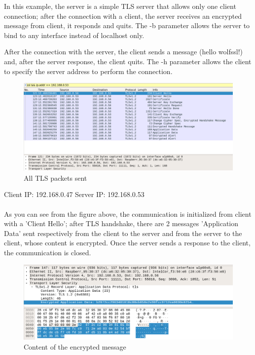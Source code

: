 \documentclass[a4paper,12pt]{article}
\begin{document}
In this example, the server is a simple TLS server that allows only one client connection; after the connection with a client, the server receives an encrypted message from client, it responds and quits.
The -b parameter allows the server to bind to any interface instead of localhost only.

After the connection with the server, the client sends a message (hello wolfssl!) and, after the server response, the client quits.
The -h parameter allows the client to specify the server address to perform the connection.

\begin{figure}[H]
    \centering
    \includegraphics[scale=0.22]{test/examples/client-server/wireshark1.png}
    \caption{All TLS packets sent}
    
\end{figure}
Client IP:  192.168.0.47 \hspace{4cm} Server IP: 192.168.0.53\\ \\
As you can see from the figure above, the communication is initialized from client with a 'Client Hello'; after TLS handshake, there are 2 messages 'Application Data' sent respectively from the client to the server and from the server to the client, whose content is encrypted. Once the server sends a response to the client, the communication is closed.

\begin{figure}[H]
    \centering
    \includegraphics[scale=0.27]{test/examples/client-server/encrypted_data.png}
    \caption{Content of the encrypted message}
    
\end{figure}
\end{document}

